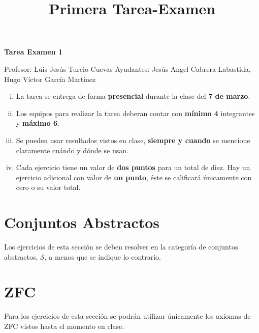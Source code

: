 \documentclass[12pt]{article}
\title{Primera Tarea-Examen}
\author{}
\date{}
\newcommand{\topos}[1]{\mathscr{#1}}
\begin{document}

    \begin{center}
        \huge \textbf{Tarea Examen 1} \\ \normalsize
    \end{center}

    \begin{flushright}
        Profesor: Luis Jesús Turcio Cuevas \hfill Ayudantes: Jesús Angel Cabrera Labastida, \\
        Hugo Víctor García Martínez
    \end{flushright}

    \begin{enumerate}[i)]
        \item La tarea se entrega de forma \textbf{presencial} durante la clase del \textbf{7 de marzo}.
        \item Los equipos para realizar la tarea deberan contar con \textbf{mínimo 4} integrantes y \textbf{máximo 6}.
        \item Se pueden usar resultados vistos en clase, \textbf{siempre y cuando} se mencione claramente cuándo y dónde se usan.
        \item Cada ejercicio tiene un valor de \textbf{dos puntos} para un total de diez. Hay un ejercicio adicional con valor de \textbf{un punto}, éste se calificará únicamente con cero o su valor total.
    \end{enumerate}

    \noindent \hdashrule{\linewidth}{0.4pt}{2mm}

    \section*{Conjuntos Abstractos}
    Los ejercicios de esta sección se deben resolver en la categoría de
    conjuntos abstractos, \(\topos{S}\), a menos que se indique lo contrario.

    
    

    \section*{ZFC}
    Para los ejercicios de esta sección se podrán utilizar únicamente los axiomas de ZFC vistos hasta el momento en clase. 
\end{document}
